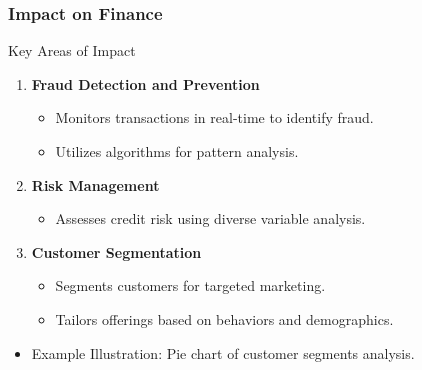 \documentclass[aspectratio=169]{beamer}
\begin{document}
\begin{frame}[fragile]
    \frametitle{Impact on Finance}
    \begin{block}{Key Areas of Impact}
        \begin{enumerate}
            \item \textbf{Fraud Detection and Prevention}
            \begin{itemize}
                \item Monitors transactions in real-time to identify fraud.
                \item Utilizes algorithms for pattern analysis.
            \end{itemize}
            \item \textbf{Risk Management}
            \begin{itemize}
                \item Assesses credit risk using diverse variable analysis.
            \end{itemize}
            \item \textbf{Customer Segmentation}
            \begin{itemize}
                \item Segments customers for targeted marketing.
                \item Tailors offerings based on behaviors and demographics.
            \end{itemize}
        \end{enumerate}
    \end{block}
    \begin{itemize}
        \item Example Illustration: Pie chart of customer segments analysis.
    \end{itemize}
\end{frame}
\end{document}
